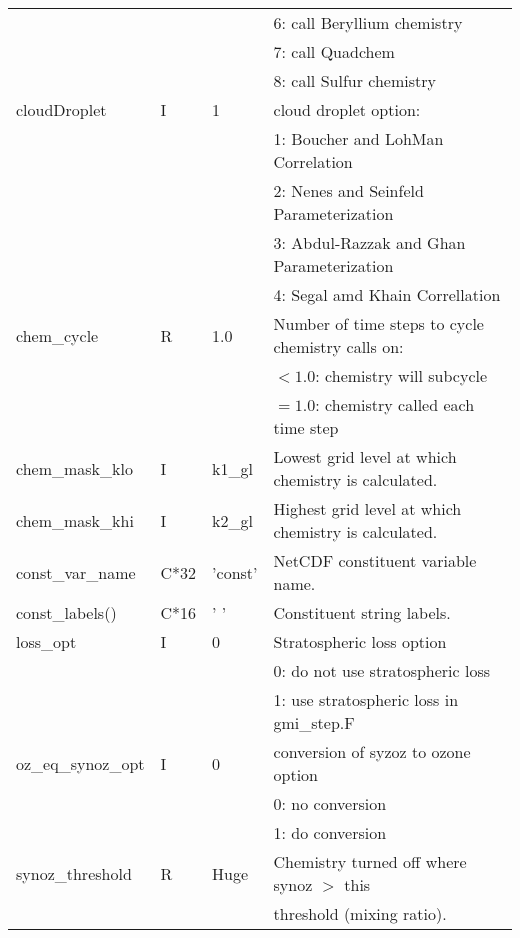 {\begin{landscape}
\begin{center}
\begin{longtable}{|l|l|l|l|}
                 &   &   & 6:  call Beryllium chemistry  \\
                 &   &   & 7:  call Quadchem  \\
                 &   &   & 8:  call Sulfur chemistry  \\ \hline
cloudDroplet     & I & 1 & cloud droplet option:  \\
                 &   &   & 1:  Boucher and LohMan    Correlation \\
                 &   &   & 2:  Nenes and Seinfeld    Parameterization  \\
                 &   &   & 3:  Abdul-Razzak and Ghan Parameterization  \\
                 &   &   & 4:  Segal amd Khain       Correllation \\ \hline
chem\_cycle      & R & 1.0 & Number of time steps to cycle chemistry calls on:  \\
                 &   &   &  $<1.0$:  chemistry will subcycle  \\
                 &   &   &  $=1.0$:  chemistry called each time step  \\ \hline
chem\_mask\_klo   & I & k1\_gl & Lowest  grid level at which chemistry is calculated.  \\ \hline
chem\_mask\_khi   & I & k2\_gl & Highest grid level at which chemistry is calculated.  \\ \hline
const\_var\_name    &C*32& 'const'& NetCDF constituent variable name.  \\ \hline
const\_labels()     &C*16& '                ' & Constituent string labels.  \\ \hline
loss\_opt       & I    &  0         &  Stratospheric loss option   \\ 
                &      &            &  0: do not use stratospheric loss   \\ 
                &      &            &  1: use stratospheric loss in gmi\_step.F  \\ \hline
oz\_eq\_synoz\_opt & I    &  0      &  conversion of syzoz to ozone option   \\ 
                &      &            &  0: no conversion   \\ 
                &      &            &  1: do conversion  \\ \hline
synoz\_threshold & R &  Huge  & Chemistry turned off where synoz $>$ this  \\
                 & & & threshold (mixing ratio).  \\ \hline

\end{longtable}
\end{center}
\end{landscape}}

